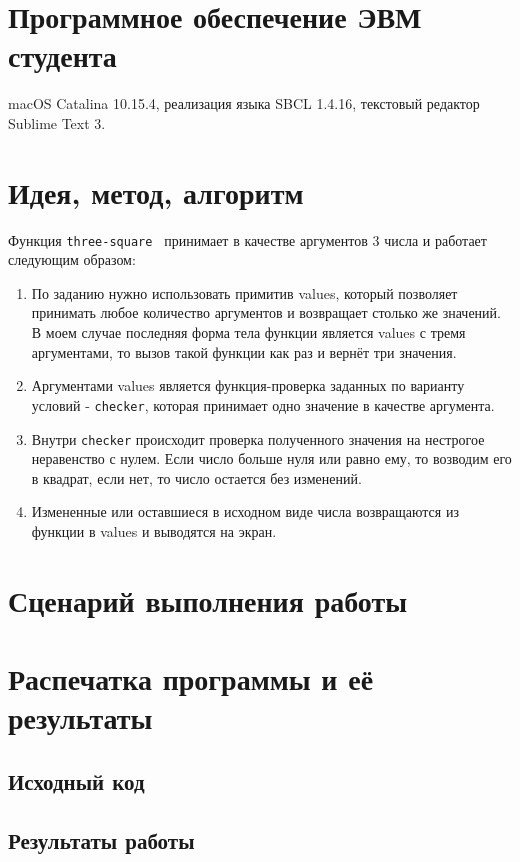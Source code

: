 \documentclass[12pt]{article}
\begin{document}
\section{Программное обеспечение ЭВМ студента}
macOS Catalina 10.15.4, реализация языка SBCL 1.4.16, текстовый редактор Sublime Text 3.
\section{Идея, метод, алгоритм}
Функция {\tt three-square } принимает в качестве аргументов 3 числа и работает следующим образом:
\begin{enumerate}
\setlength{\itemsep}{-1mm} %
\item По заданию нужно использовать примитив values, который позволяет принимать любое количество аргументов и возвращает столько же значений. В моем случае последняя форма тела функции является values с тремя аргументами, то вызов такой функции как раз и вернёт три значения.
\item Аргументами values является функция-проверка заданных по варианту условий - {\tt checker}, которая принимает одно значение в качестве аргумента.
\item Внутри {\tt checker} происходит проверка полученного значения на нестрогое неравенство с нулем. Если число больше нуля или равно ему, то возводим его в квадрат, если нет, то число остается без изменений.
\item Измененные или оставшиеся в исходном виде числа возвращаются из функции в values и выводятся на экран.
\end{enumerate}

\section{Сценарий выполнения работы}

\section{Распечатка программы и её результаты}

\subsection{Исходный код}


\subsection{Результаты работы}

\end{document}
